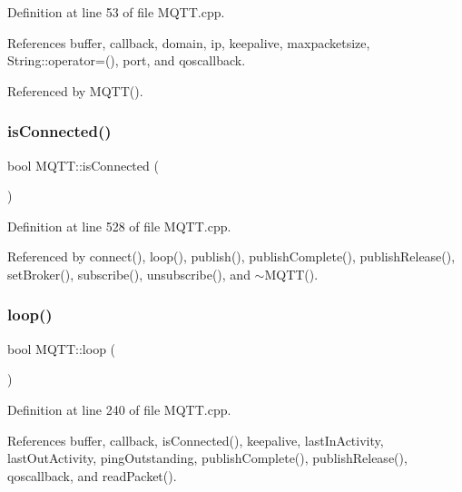 Definition at line 53 of file M\+Q\+T\+T.\+cpp.



References buffer, callback, domain, ip, keepalive, maxpacketsize, String\+::operator=(), port, and qoscallback.



Referenced by M\+Q\+T\+T().

\mbox{\label{class_m_q_t_t_a57a5231fd3205682c56de70e57dd9d62}} 
\subsubsection{\texorpdfstring{is\+Connected()}{isConnected()}}
{\footnotesize\ttfamily bool M\+Q\+T\+T\+::is\+Connected (\begin{DoxyParamCaption}{ }\end{DoxyParamCaption})}



Definition at line 528 of file M\+Q\+T\+T.\+cpp.



Referenced by connect(), loop(), publish(), publish\+Complete(), publish\+Release(), set\+Broker(), subscribe(), unsubscribe(), and $\sim$\+M\+Q\+T\+T().

\mbox{\label{class_m_q_t_t_a5f9624e440c99d7ec0fb0a8c1a30d064}} 
\subsubsection{\texorpdfstring{loop()}{loop()}}
{\footnotesize\ttfamily bool M\+Q\+T\+T\+::loop (\begin{DoxyParamCaption}{ }\end{DoxyParamCaption})}



Definition at line 240 of file M\+Q\+T\+T.\+cpp.



References buffer, callback, is\+Connected(), keepalive, last\+In\+Activity, last\+Out\+Activity, ping\+Outstanding, publish\+Complete(), publish\+Release(), qoscallback, and read\+Packet().

\mbox{\label{class_m_q_t_t_a0a335a0e6c60ea0e256f76a1969a5137}} 
